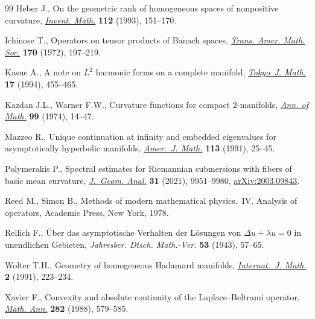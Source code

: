 \documentclass[pdftex]{sigma}
\numberwithin{equation}{section}
\begin{document}
\begin{thebibliography}{99}
Heber J., On the geometric rank of homogeneous spaces of nonpositive curvature,
 \href{https://doi.org/10.1007/BF01232428}{\textit{Invent. Math.}} \textbf{112} (1993), 151--170.

Ichinose T., Operators on tensor products of {B}anach spaces, \href{https://doi.org/10.2307/1996304}{\textit{Trans.
 Amer. Math. Soc.}} \textbf{170} (1972), 197--219.

Kasue A., A note on {$L^2$} harmonic forms on a complete manifold,
 \href{https://doi.org/10.3836/tjm/1270127966}{\textit{Tokyo~J. Math.}} \textbf{17} (1994), 455--465.

Kazdan J.L., Warner F.W., Curvature functions for compact {$2$}-manifolds,
 \href{https://doi.org/10.2307/1971012}{\textit{Ann. of Math.}} \textbf{99} (1974), 14--47.

Mazzeo R., Unique continuation at infinity and embedded eigenvalues for
 asymptotically hyperbolic manifolds, \href{https://doi.org/10.2307/2374820}{\textit{Amer.~J. Math.}} \textbf{113}
 (1991), 25--45.

Polymerakis P., Spectral estimates for {R}iemannian submersions with fibers of
 basic mean curvature, \href{https://doi.org/10.1007/s12220-021-00634-z}{\textit{J.~Geom. Anal.}} \textbf{31} (2021), 9951--9980,
 \href{https://arxiv.org/abs/2003.09843}{arXiv:2003.09843}.

Reed M., Simon B., Methods of modern mathematical physics.~{IV}. {A}nalysis of
 operators, Academic Press, New York, 1978.

Rellich F., \"{U}ber das asymptotische {V}erhalten der {L}\"osungen von
 {$\Delta u+\lambda u=0$} in unendlichen {G}ebieten, \textit{Jahresber. Dtsch.
 Math.-Ver.} \textbf{53} (1943), 57--65.

Wolter T.H., Geometry of homogeneous {H}adamard manifolds, \href{https://doi.org/10.1142/S0129167X91000430}{\textit{Internat.~J.
 Math.}} \textbf{2} (1991), 223--234.

Xavier F., Convexity and absolute continuity of the {L}aplace--{B}eltrami
 operator, \href{https://doi.org/10.1007/BF01462884}{\textit{Math. Ann.}} \textbf{282} (1988), 579--585.

\end{thebibliography}\LastPageEnding
\end{document}

